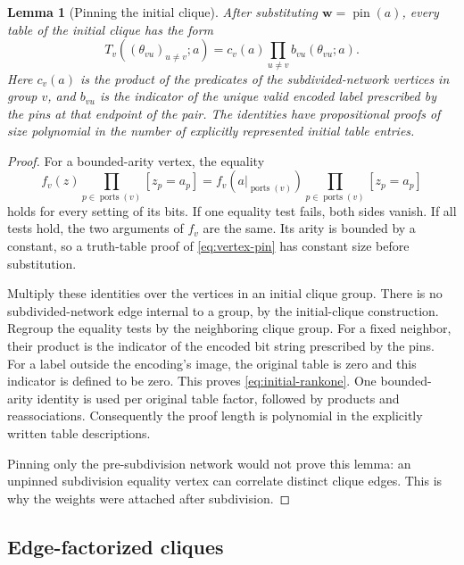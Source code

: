 \documentclass[11pt]{article}
\newtheorem{lemma}[theorem]{Lemma}
\theoremstyle{definition}
\theoremstyle{remark}
\begin{document}
\begin{lemma}[Pinning the initial clique]
\label{lem:initial-port-pinning}
After substituting $\mathbf w=\operatorname{pin}(a)$, every table of
the initial clique has the form
\[
 T_v((\theta_{vu})_{u\ne v};a)
   =c_v(a)\prod_{u\ne v}b_{vu}(\theta_{vu};a).
 \tag{\thesection.3}\label{eq:initial-rankone}
\]
Here $c_v(a)$ is the product of the predicates of the subdivided-network
vertices in group $v$, and $b_{vu}$ is the indicator of the unique
valid encoded label prescribed by the pins at that endpoint of the
pair. The identities have propositional proofs of size polynomial in
the number of explicitly represented initial table entries.
\end{lemma}
\begin{proof}
For a bounded-arity vertex, the equality
\[
 f_v(z)\prod_{p\in\operatorname{ports}(v)}[z_p=a_p]
 =f_v(a|_{\operatorname{ports}(v)})
   \prod_{p\in\operatorname{ports}(v)}[z_p=a_p]
 \tag{\thesection.4}\label{eq:vertex-pin}
\]
holds for every setting of its bits. If one equality test fails, both
sides vanish. If all tests hold, the two arguments of $f_v$ are the
same. Its arity is bounded by a constant, so a truth-table proof of
\eqref{eq:vertex-pin} has constant size before substitution.

Multiply these identities over the vertices in an initial clique
group. There is no subdivided-network edge internal to a group, by
the initial-clique construction. Regroup the equality tests by the
neighboring clique group. For a fixed neighbor, their product is the
indicator of the encoded bit string prescribed by the pins. For a
label outside the encoding's image, the original table is zero and
this indicator is defined to be zero. This proves
\eqref{eq:initial-rankone}. One bounded-arity identity is used per
original table factor, followed by products and reassociations.
Consequently the proof length is polynomial in the explicitly written
table descriptions.

Pinning only the pre-subdivision network would not prove this lemma:
an unpinned subdivision equality vertex can correlate distinct clique
edges. This is why the weights were attached after subdivision.
\end{proof}

\subsection{Edge-factorized cliques}
\end{document}
